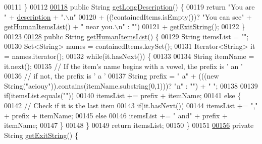 \begin{DoxyCode}
00111     \}
00112 
\hypertarget{Room_8java_source_l00118}{}\hyperlink{classRoom_a23a25854d7544fb0b41190a4d6bd1322}{00118}     \textcolor{keyword}{public} String \hyperlink{classRoom_a23a25854d7544fb0b41190a4d6bd1322}{getLongDescription}() \{
00119         \textcolor{keywordflow}{return} \textcolor{stringliteral}{"You are "} + \hyperlink{classRoom_a2d7ecf802690a6b13750ca6fa6882d77}{description} + \textcolor{stringliteral}{".\(\backslash\)n"}
00120                 + ((!containedItems.isEmpty())? \textcolor{stringliteral}{"You can see"} + 
      \hyperlink{classRoom_ab8a87ad306f77a936873094b479bcde8}{getHumanItemsList}() + \textcolor{stringliteral}{" near you.\(\backslash\)n"} : \textcolor{stringliteral}{""})
00121                 + \hyperlink{classRoom_a2ccc382c07890a9827be232767eb98a0}{getExitString}();
00122     \}
00123 
\hypertarget{Room_8java_source_l00128}{}\hyperlink{classRoom_ab8a87ad306f77a936873094b479bcde8}{00128}     \textcolor{keyword}{public} String \hyperlink{classRoom_ab8a87ad306f77a936873094b479bcde8}{getHumanItemsList}() \{
00129         String itemsList = \textcolor{stringliteral}{""};
00130         Set<String> names = containedItems.keySet();
00131         Iterator<String> it = names.iterator();
00132         \textcolor{keywordflow}{while}(it.hasNext()) \{
00133 
00134             String itemName = it.next();
00135             \textcolor{comment}{// If the item's name begins with a vowel, the prefix is ' an '}
00136             \textcolor{comment}{// if not, the prefix is ' a '}
00137             String prefix = \textcolor{stringliteral}{" a"} + (((\textcolor{keyword}{new} String(\textcolor{stringliteral}{"aeiouy"})).contains(itemName.substring(0,1)))? \textcolor{stringliteral}{"n"} : \textcolor{stringliteral}{""}) +
       \textcolor{stringliteral}{" "};
00138 
00139             \textcolor{keywordflow}{if}(itemsList.equals(\textcolor{stringliteral}{""}))
00140                 itemsList += prefix + itemName;
00141             \textcolor{keywordflow}{else} \{
00142                 \textcolor{comment}{// Check if it is the last item}
00143                 \textcolor{keywordflow}{if}(it.hasNext())
00144                     itemsList += \textcolor{stringliteral}{","} + prefix + itemName;
00145                 \textcolor{keywordflow}{else}
00146                     itemsList += \textcolor{stringliteral}{" and"} + prefix + itemName;
00147             \}
00148         \}
00149         \textcolor{keywordflow}{return} itemsList;
00150     \}
00151 
\hypertarget{Room_8java_source_l00156}{}\hyperlink{classRoom_a2ccc382c07890a9827be232767eb98a0}{00156}     \textcolor{keyword}{private} String \hyperlink{classRoom_a2ccc382c07890a9827be232767eb98a0}{getExitString}() \{

\end{DoxyCode}
